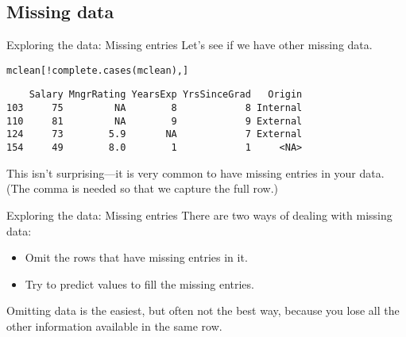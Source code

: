 \documentclass{beamer}\usepackage[]{graphicx}\usepackage[]{color}
\makeatletter
\newcommand{\hlopt}[1]{\textcolor[rgb]{1,0.894,0.769}{#1}}%
\newcommand{\hlstd}[1]{\textcolor[rgb]{1,0.894,0.769}{#1}}%
\newcommand{\hlkwb}[1]{\textcolor[rgb]{0.804,0.776,0.451}{#1}}%
\newcommand{\hlkwc}[1]{\textcolor[rgb]{0.78,0.941,0.545}{#1}}%
\newcommand{\hlkwd}[1]{\textcolor[rgb]{1,0.78,0.769}{#1}}%
\newenvironment{kframe}{%
 \def\at@end@of@kframe{}%
 \ifinner\ifhmode%
  \def\at@end@of@kframe{\end{minipage}}%
  \begin{minipage}{\columnwidth}%
 \fi\fi%
 \def\FrameCommand##1{\hskip\@totalleftmargin \hskip-\fboxsep
 \colorbox{shadecolor}{##1}\hskip-\fboxsep
     \hskip-\linewidth \hskip-\@totalleftmargin \hskip\columnwidth}%
 \MakeFramed {\advance\hsize-\width
   \@totalleftmargin\z@ \linewidth\hsize
   \@setminipage}}%
 {\par\unskip\endMakeFramed%
 \at@end@of@kframe}
\newenvironment{knitrout}{}{} %
\makeatother
\begin{document}
\begin{darkframes}
    \section{Missing data}

    \begin{frame}[fragile]{Exploring the data: Missing entries}
      Let's see if we have other missing data.
\begin{knitrout}
\begin{kframe}
\begin{alltt}
\hlstd{mclean[}\hlopt{!}\hlkwd{complete.cases}\hlstd{(mclean),]}
\end{alltt}
\begin{verbatim}
    Salary MngrRating YearsExp YrsSinceGrad   Origin
103     75         NA        8            8 Internal
110     81         NA        9            9 External
124     73        5.9       NA            7 External
154     49        8.0        1            1     <NA>
\end{verbatim}
\end{kframe}
\end{knitrout}
      \pause
      This isn't surprising---it is very common to have missing entries in your data. (The comma is needed so that we capture the full row.)
    \end{frame}

    \begin{frame}[fragile]{Exploring the data: Missing entries}
      There are two ways of dealing with missing data:
      \begin{itemize}
        \item Omit the rows that have missing entries in it.
        \item Try to predict values to fill the missing entries.
      \end{itemize}
      Omitting data is the easiest, but often not the best way, \alert{because you lose all the other information available in the same row}.
    \end{frame}

\end{darkframes}
\end{document}
